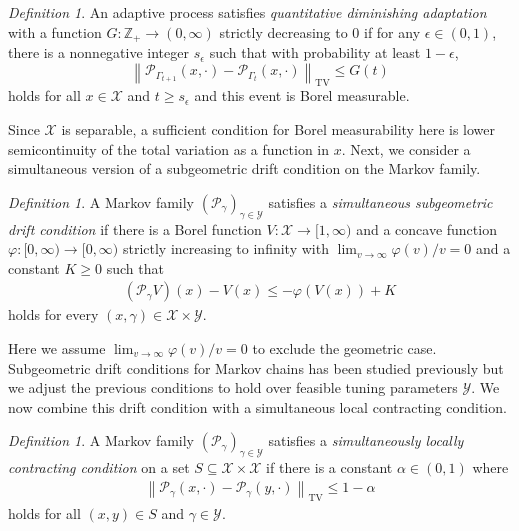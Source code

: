 \documentclass[12pt]{article}
\theoremstyle{plain}
\theoremstyle{remark}
\newtheorem{definition}[theorem]{Definition}
\newcommand{\norm}[1]{\left\lVert#1\right\rVert}
\newcommand{\e}{\epsilon}
\newcommand{\Z}{\mathbb{Z}}
\renewcommand{\P}{\mathcal{P}}
\newcommand{\X}{\mathcal{X}}
\newcommand{\Y}{\mathcal{Y}}
\let\temp\phi
\let\phi\varphi
\let\varphi\temp
\begin{document}
\begin{definition}
An adaptive process satisfies \textit{quantitative diminishing adaptation} with a function $G : \Z_+ \to (0, \infty)$ strictly decreasing to 0 if for any $\e \in (0, 1)$, there is a nonnegative integer $s_\e$ such that with probability at least $1 - \e$,
\begin{equation}
\norm{\P_{\Gamma_{t + 1}}(x, \cdot) - \P_{\Gamma_t}(x, \cdot)}_{\text{TV}}
\le G(t)
\label{eq:da}
\end{equation}
holds for all $x \in \X$ and $t \ge s_{\e}$ and this event is Borel measurable.
\end{definition}

\noindent 
Since $\X$ is separable, a sufficient condition for Borel measurability here is lower semicontinuity of the total variation as a function in $x$.
Next, we consider a simultaneous version of a subgeometric drift condition on the Markov family.

\begin{definition}
A Markov family $(\P_\gamma)_{\gamma \in \Y}$ satisfies a \textit{simultaneous subgeometric drift condition} if there is a Borel function $V : \X \to [1, \infty)$ and a concave function $\phi : [0, \infty) \to [0, \infty)$ strictly increasing to infinity with $\lim_{v \to \infty} \phi(v)/v = 0$ and a constant $K \ge 0$ such that
\begin{align}
(\P_\gamma V)(x) - V(x)
\le -\phi( V(x) ) + K
\label{eq:sim_subgeo_drift}
\end{align}
holds for every $(x, \gamma) \in  \X \times \Y$.
\end{definition}

Here we assume $\lim_{v \to \infty} \phi(v)/v = 0$ to exclude the geometric case. 
Subgeometric drift conditions for Markov chains has been studied previously \citep{douc:etal:2004,jarner:roberts:2002} but we adjust the previous conditions to hold over feasible tuning parameters $\Y$. We now combine this drift condition with a simultaneous local contracting condition.

\begin{definition}
A Markov family $(\P_\gamma)_{\gamma \in \Y}$ satisfies a \textit{simultaneously locally contracting condition} on a set $S \subseteq \X \times \X$ if there is a constant $\alpha \in (0, 1)$ where
\begin{align}
\norm{ \P_\gamma(x, \cdot) - \P_\gamma(y, \cdot) }_{\text{TV}}
\le 1 - \alpha
\label{eq:local_contractive}
\end{align}
holds for all $(x, y) \in S$ and $\gamma \in \Y$.
\end{definition}
\end{document}
